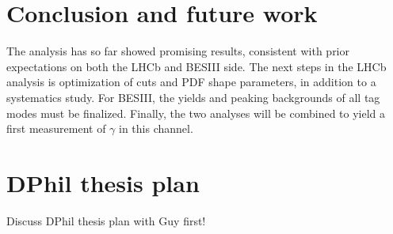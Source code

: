 \documentclass[12pt, a4paper, notitlepage, onecolumn]{article}
\begin{document}
\section{Conclusion and future work}
\noindent The analysis has so far showed promising results, consistent with prior expectations on both the LHCb and BESIII side. The next steps in the LHCb analysis is optimization of cuts and PDF shape parameters, in addition to a systematics study. For BESIII, the yields and peaking backgrounds of all tag modes must be finalized. Finally, the two analyses will be combined to yield a first measurement of $\gamma$ in this channel.




\newpage
\section{DPhil thesis plan}
\noindent Discuss DPhil thesis plan with Guy first!
\end{document}
